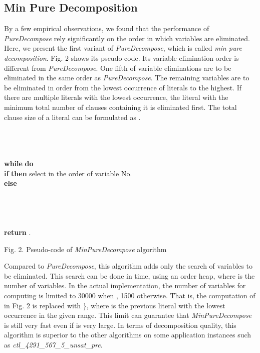\documentclass{llncs}
\begin{document}
\subsection{Min Pure Decomposition}

   By a few empirical observations, we found that the performance of \emph{PureDecompose} rely significantly
on the order in which variables are eliminated. Here, we present the
first variant of \emph{PureDecompose},  which is called \emph{min
pure decomposition}. Fig. 2 shows its pseudo-code.  Its variable
elimination order is different from \emph{PureDecompose}. One fifth
of variable eliminations are to be eliminated in the same order as
\emph{PureDecompose}. The remaining variables are to be eliminated
in order from the lowest occurrence of literals to the highest. If
there are multiple literals  with the lowest occurrence, the literal
with the minimum total number of clauses containing it is eliminated
first. The total clause size of a literal  can be formulated as
.

\begin{flushleft}
\begin{sf}
\begin{footnotesize}
\hskip 12mm \\
\hskip 16mm \\
\hskip 16mm \\
\hskip 16mm {\bf while }  {\bf do}\\
\hskip 20mm    {\bf if }     {\bf then }
select
 in the order of variable No. \\
\hskip 20mm    {\bf else} \\
\hskip 27mm       \\
\hskip 20mm    \\
\hskip 20mm    \\
\hskip 20mm    \\
\hskip 16mm  {\bf return} .

\vspace{1em}

\hskip 8mm \textrm{Fig. 2. Pseudo-code of \emph{MinPureDecompose}
algorithm}
\end{footnotesize}
\end{sf}
\end{flushleft}

Compared to \emph{PureDecompose}, this algorithm adds only the
search of variables to be eliminated. This search can be done in
 time, using an order heap, where  is the number of
variables. In the actual implementation, the number  of
variables for computing  is limited to
30000 when , 1500 otherwise. That is, the computation of
 in Fig. 2 is replaced with \}, where  is the
previous literal  with the lowest occurrence in the given range.
This limit can guarantee that \emph{MinPureDecompose} is still very
fast even if  is very large. In terms of decomposition quality,
this algorithm is superior to the other algorithms on some
application instances such as \emph{ctl\_4291\_567\_5\_unsat\_pre}.
\end{document}

